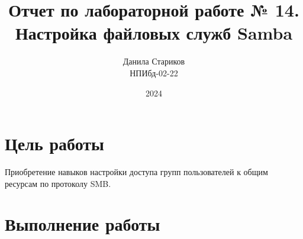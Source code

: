 

\title{Отчет по лабораторной работе № 14. \\ Настройка файловых служб Samba}
\author{Данила Стариков \\ НПИбд-02-22}
\date{2024}



\maketitle
\newpage
\tableofcontents

\newpage
\section{Цель работы}
Приобретение навыков настройки доступа групп пользователей к общим ресурсам по протоколу SMB.
\newpage

\section{Выполнение работы}

